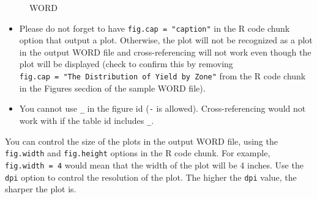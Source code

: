 \documentclass[
  letterpaper,
  DIV=11,
  numbers=noendperiod]{scrreprt}
\providecommand{\tightlist}{%
  \setlength{\itemsep}{0pt}\setlength{\parskip}{0pt}}\usepackage{longtable,booktabs,array}
\begin{document}
\begin{tcolorbox}[enhanced jigsaw, colframe=quarto-callout-note-color-frame, breakable, left=2mm, toprule=.15mm, colback=white, arc=.35mm, rightrule=.15mm, bottomrule=.15mm, opacityback=0, leftrule=.75mm]
\begin{figure}[H]
\begin{minipage}[t]{\linewidth}
{{}

\caption{WORD}

}

\end{minipage}%

\end{figure}

\end{tcolorbox}

\begin{tcolorbox}[enhanced jigsaw, colframe=quarto-callout-important-color-frame, toptitle=1mm, colbacktitle=quarto-callout-important-color!10!white, toprule=.15mm, colback=white, arc=.35mm, bottomtitle=1mm, opacitybacktitle=0.6, breakable, left=2mm, coltitle=black, leftrule=.75mm, title=\textcolor{quarto-callout-important-color}{\faExclamation}\hspace{0.5em}{Important}, rightrule=.15mm, titlerule=0mm, opacityback=0, bottomrule=.15mm]

\begin{itemize}
\tightlist
\item
  Please do not forget to have \texttt{fig.cap\ =\ "caption"} in the R
  code chunk option that output a plot. Otherwise, the plot will not be
  recognized as a plot in the output WORD file and cross-referencing
  will not work even though the plot will be displayed (check to confirm
  this by removing
  \texttt{fig.cap\ =\ "The\ Distribution\ of\ Yield\ by\ Zone"} from the
  R code chunk in the Figures secdion of the sample WORD file).
\item
  You cannot use \texttt{\_} in the figure id (\texttt{-} is allowed).
  Cross-referencing would not work with if the table id includes
  \texttt{\_}.
\end{itemize}

\end{tcolorbox}

You can control the size of the plots in the output WORD file, using the
\texttt{fig.width} and \texttt{fig.height} options in the R code chunk.
For example, \texttt{fig.width\ =\ 4} would mean that the width of the
plot will be 4 inches. Use the \texttt{dpi} option to control the
resolution of the plot. The higher the \texttt{dpi} value, the sharper
the plot is.
\end{document}
